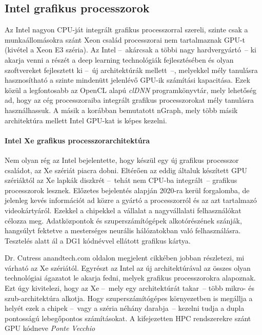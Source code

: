 \subsection{Intel grafikus processzorok}
Az Intel nagyon CPU-ját integrált grafikus processzorral szereli, szinte csak a munkaállomásokra szánt Xeon család processzorai nem tartalmaznak GPU-t (kivétel a Xeon E3 széria).\cite{wiki:listOfIGPU} Az Intel --~akárcsak a többi nagy hardvergyártó~-- ki akarja venni a részét a deep learning technológiák  fejlesztésében és olyan szoftvereket fejlesztett ki --~új architektúrák mellett~--, melyekkel mély tanulásra hasznosítható a szinte mindenütt jelenlévő GPU-ik számítási kapacitása. Ezek közül a legfontosabb az OpenCL alapú \emph{clDNN} programkönyvtár, mely lehetőség ad, hogy az cég processzoraiba integrált grafikus processzorokat mély tanulásra használhassuk. A másik a korábban bemutatott nGraph, mely több másik architektúra mellett Intel GPU-kat is képes kezelni.

\paragraph{Intel Xe grafikus processzorarchitektúra}
Nem olyan rég az Intel bejelentette, hogy készül egy új grafikus processzor családot, az Xe szériát piacra dobni. Eltérően az eddig általuk készített GPU szériáktól az Xe lapkák diszkrét --~tehát nem CPU-ba integrált~-- grafikus processzorok lesznek. Előzetes bejelentés alapján 2020-ra kerül forgalomba, de jelenleg kevés információt ad közre a gyártó a processzorról és az azt tartalmazó videokártyáról.\cite{tyson-hexus} Ezekkel a chipekkel a vállalat a nagyvállalati felhasználókat célozza meg. Adatközpontok és szuperszámítógépek alkotórészének szánják, hangsúlyt fektetve a mesterséges neurális hálózatokban való felhasználásra. Tesztelés alatt ál a DG1 kódnévvel ellátott grafikus kártya.\cite{allan-techradar} 

Dr. Cutress anandtech.com oldalon megjelent cikkében jobban részletezi, mi várható az Xe szériától.\cite{cutress-anandtech} Egyrészt az Intel az új architektúrával az összes olyan technológiai ágazatot le akarja fedni, melyek grafikus processzorokra alapoznak. Ezt úgy kivitelezi, hogy az Xe --~mely egy architektúrát takar~-- több mikro- és szub-architektúra alkotja.
Hogy szuperszámítógépes környezetben is megállja a helyét ezek a chipek --~vagy a széria néhány darabja~-- kezelni tudja a dupla pontosságú lebegőpontos számításokat. A kifejezetten HPC rendszerekre szánt GPU kódneve \emph{Ponte Vecchio}

